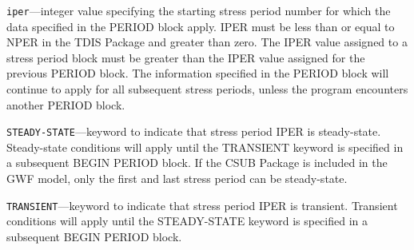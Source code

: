 \begin{description}
\item \texttt{iper}---integer value specifying the starting stress period number for which the data specified in the PERIOD block apply.  IPER must be less than or equal to NPER in the TDIS Package and greater than zero.  The IPER value assigned to a stress period block must be greater than the IPER value assigned for the previous PERIOD block.  The information specified in the PERIOD block will continue to apply for all subsequent stress periods, unless the program encounters another PERIOD block.

\item \texttt{STEADY-STATE}---keyword to indicate that stress period IPER is steady-state. Steady-state conditions will apply until the TRANSIENT keyword is specified in a subsequent BEGIN PERIOD block. If the CSUB Package is included in the GWF model, only the first and last stress period can be steady-state.

\item \texttt{TRANSIENT}---keyword to indicate that stress period IPER is transient. Transient conditions will apply until the STEADY-STATE keyword is specified in a subsequent BEGIN PERIOD block.

\end{description}

